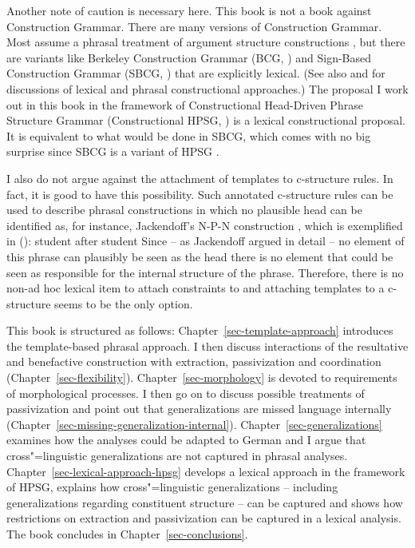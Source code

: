 Another note of caution is necessary here. This book is not a book against Construction
Grammar. There are many versions of Construction Grammar. Most assume a phrasal treatment of
argument structure constructions
\citep{Tomasello2003a,Goldberg95a,Goldberg2006a,GJ2004a,BC2005a,vanTrijp2011a}, but there are variants
like Berkeley Construction Grammar (BCG, \citealp{KF99a,MR2001a,Kay2005a}) and Sign-Based Construction Grammar (SBCG, \citealp*{Sag2012a,SBK2012a}) that are explicitly lexical. (See also  and 
for discussions of lexical and phrasal constructional approaches.) The proposal I work out in this
book in the framework of Constructional Head-Driven Phrase Structure Grammar (Constructional HPSG,
\citealp{Sag97a}) is a lexical constructional proposal. It is equivalent to what would be done in
SBCG, which comes with no big surprise since SBCG is a variant of HPSG \citep[486]{Sag2010b}.

I also do not argue against the attachment of templates to c-structure rules. In fact, it is good to
have this possibility. Such annotated c-structure rules can be used to describe phrasal constructions in which no plausible head
can be identified as, for instance, Jackendoff's N-P-N construction \citeyearpar{Jackendoff2008a}, which is exemplified in
():
\ea
student after student
\z
Since -- as Jackendoff argued in detail -- no element of this phrase can plausibly be seen as the head
there is no element that could be seen as responsible for the internal structure of the
phrase. Therefore, there is no non-ad hoc lexical item to attach constraints to and attaching
templates to a c-structure seems to be the only option.

This book is structured as follows: Chapter~\ref{sec-template-approach} introduces the
template-based phrasal approach. I then discuss interactions of the resultative
and benefactive construction with extraction, passivization and coordination
(Chapter~\ref{sec-flexibility}). Chapter~\ref{sec-morphology} is devoted to requirements of
morphological processes. 
I then go on to discuss possible
treatments of passivization and point out that generalizations are missed language internally
(Chapter~\ref{sec-missing-generalization-internal}).
Chapter~\ref{sec-generalizations} examines how the analyses could be adapted to German and I argue
that cross"=linguistic generalizations are not captured in phrasal
analyses. Chapter~\ref{sec-lexical-approach-hpsg} develops a lexical approach in the framework of
HPSG, explains how cross"=linguistic generalizations -- including generalizations regarding
constituent structure -- can be captured and shows how restrictions on
extraction and passivization can be captured in a lexical analysis. The book concludes in Chapter~\ref{sec-conclusions}.



